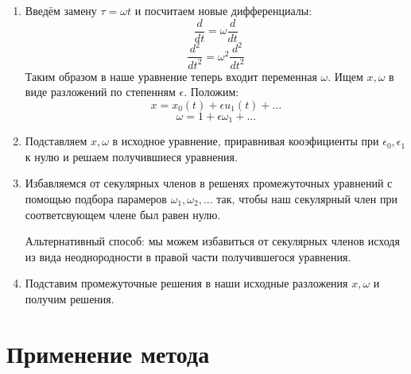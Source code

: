 \documentclass[bachelor, och, coursework, times]{SCWorks}
\begin{document}
\begin{enumerate} 

\item 
Введём замену $\tau=\omega t$ и посчитаем новые дифференциалы: 
$$\frac{d}{dt}=\omega\frac{d}{dt}$$
$$\frac{d^2}{dt^2}=\omega^2\frac{d^2}{dt^2}$$
Таким образом в наше уравнение теперь входит переменная $\omega$. Ищем $x,\omega$ в виде разложений по степенням $\epsilon$. Положим: 
$$x=x_0(t)+\epsilon u_1(t)+\ldots$$
$$\omega=1+\epsilon \omega_1+\ldots$$

\item
Подставляем $x,\omega$ в исходное уравнение, приравнивая кооэфициенты при $\epsilon_0, \epsilon_1$ к нулю и решаем получившиеся уравнения.

\item
Избавляемся от секулярных членов в решенях промежуточных уравнений с помощью подбора парамеров $\omega_1, \omega_2, \ldots$ так, чтобы наш секулярный член при соответсвующем члене был равен нулю.

Альтернативный способ: мы можем избавиться от секулярных членов исходя из вида неоднородности в правой части получившегося уравнения.

\item
Подставим промежуточные решения в наши исходные разложения $x,\omega$ и получим решения.

\end{enumerate}

\section{Применение метода}
\end{document}
